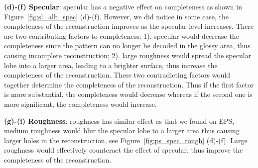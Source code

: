 \noindent\textbf{(d)-(f) Specular}: specular has a negative effect on completeness as shown in Figure~\ref{fig:sl_alb_spec} (d)-(f). However, we did notice in some case, the completeness of the reconstruction improves as the specular level increases. There are two contributing factors to completeness: 1). specular would decrease the completeness since the pattern can no longer be decoded in the glossy area, thus causing incomplete reconstruction; 2). large roughness would spread the specular lobe into a larger area, leading to a brighter surface, thus increase the completeness of the reconstruction. These two contradicting factors would together determine the completeness of the reconstruction. Thus if the first factor is more substantial, the completeness would decrease whereas if the second one is more significant, the completeness would increase.

\noindent\textbf{(g)-(i) Roughness}: roughness has similar effect as that we found on EPS, \ie medium roughness would blur the specular lobe to a larger area thus causing larger holes in the reconstruction, see Figure~\ref{fig:ps_spec_rough} (d)-(f). Large roughness would effectively counteract the effect of specular, thus improve the completeness of the reconstruction.



